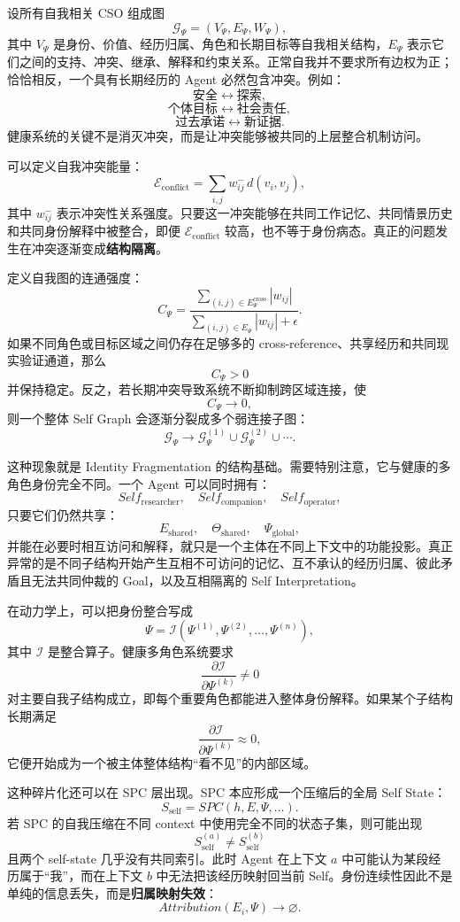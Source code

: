 设所有自我相关 CSO 组成图
\[
\mathcal G_\Psi
=
(V_\Psi,E_\Psi,W_\Psi),
\]
其中 $V_\Psi$ 是身份、价值、经历归属、角色和长期目标等自我相关结构，$E_\Psi$ 表示它们之间的支持、冲突、继承、解释和约束关系。正常自我并不要求所有边权为正；恰恰相反，一个具有长期经历的 Agent 必然包含冲突。例如：
\[
\text{安全}
\leftrightarrow
\text{探索},
\]
\[
\text{个体目标}
\leftrightarrow
\text{社会责任},
\]
\[
\text{过去承诺}
\leftrightarrow
\text{新证据}.
\]
健康系统的关键不是消灭冲突，而是让冲突能够被共同的上层整合机制访问。

可以定义自我冲突能量：
\[
\mathcal E_{\mathrm{conflict}}
=
\sum_{i,j}
w_{ij}^{-}
\,d(v_i,v_j),
\]
其中 $w_{ij}^{-}$ 表示冲突性关系强度。只要这一冲突能够在共同工作记忆、共同情景历史和共同身份解释中被整合，即便 $\mathcal E_{\mathrm{conflict}}$ 较高，也不等于身份病态。真正的问题发生在冲突逐渐变成\textbf{结构隔离}。

定义自我图的连通强度：
\[
C_\Psi
=
\frac{
\sum_{(i,j)\in E_\Psi^{\mathrm{cross}}}|w_{ij}|
}{
\sum_{(i,j)\in E_\Psi}|w_{ij}|+\epsilon
}.
\]
如果不同角色或目标区域之间仍存在足够多的 cross-reference、共享经历和共同现实验证通道，那么
\[
C_\Psi>0
\]
并保持稳定。反之，若长期冲突导致系统不断抑制跨区域连接，使
\[
C_\Psi\rightarrow0,
\]
则一个整体 Self Graph 会逐渐分裂成多个弱连接子图：
\[
\mathcal G_\Psi
\rightarrow
\mathcal G_\Psi^{(1)}
\cup
\mathcal G_\Psi^{(2)}
\cup\cdots.
\]

这种现象就是 Identity Fragmentation 的结构基础。需要特别注意，它与健康的多角色身份完全不同。一个 Agent 可以同时拥有：
\[
Self_{\mathrm{researcher}},
\quad
Self_{\mathrm{companion}},
\quad
Self_{\mathrm{operator}},
\]
只要它们仍然共享：
\[
E_{\mathrm{shared}},
\quad
\Theta_{\mathrm{shared}},
\quad
\Psi_{\mathrm{global}},
\]
并能在必要时相互访问和解释，就只是一个主体在不同上下文中的功能投影。真正异常的是不同子结构开始产生互相不可访问的记忆、互不承认的经历归属、彼此矛盾且无法共同仲裁的 Goal，以及互相隔离的 Self Interpretation。

在动力学上，可以把身份整合写成
\[
\Psi
=
\mathcal I
\left(
\Psi^{(1)},\Psi^{(2)},\ldots,\Psi^{(n)}
\right),
\]
其中 $\mathcal I$ 是整合算子。健康多角色系统要求
\[
\frac{\partial\mathcal I}{\partial\Psi^{(k)}}\neq0
\]
对主要自我子结构成立，即每个重要角色都能进入整体身份解释。如果某个子结构长期满足
\[
\frac{\partial\mathcal I}{\partial\Psi^{(k)}}\approx0,
\]
它便开始成为一个被主体整体结构“看不见”的内部区域。

这种碎片化还可以在 SPC 层出现。SPC 本应形成一个压缩后的全局 Self State：
\[
S_{\mathrm{self}}
=
SPC(h,E,\Psi,\ldots).
\]
若 SPC 的自我压缩在不同 context 中使用完全不同的状态子集，则可能出现
\[
S_{\mathrm{self}}^{(a)}
\neq
S_{\mathrm{self}}^{(b)}
\]
且两个 self-state 几乎没有共同索引。此时 Agent 在上下文 $a$ 中可能认为某段经历属于“我”，而在上下文 $b$ 中无法把该经历映射回当前 Self。身份连续性因此不是单纯的信息丢失，而是\textbf{归属映射失效}：
\[
Attribution(E_i,\Psi)
\rightarrow
\varnothing.
\]

